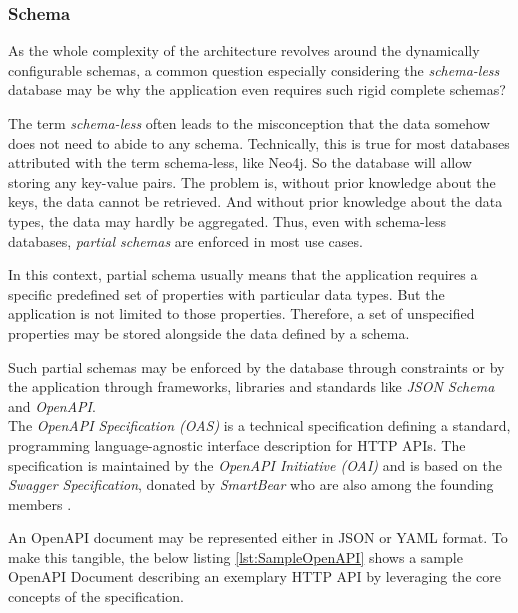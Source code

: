 \subsubsection{Schema}
As the whole complexity of the architecture revolves around the dynamically configurable schemas, a common question especially considering the \emph{schema-less} database may be why the application even requires such rigid complete schemas?\par
The term \emph{schema-less} often leads to the misconception that the data somehow does not need to abide to any schema. Technically, this is true for most databases attributed with the term schema-less, like Neo4j. So the database will allow storing any key-value pairs. The problem is, without prior knowledge about the keys, the data cannot be retrieved. And without prior knowledge about the data types, the data may hardly be aggregated. Thus, even with schema-less databases, \emph{partial schemas} are enforced in most use cases.\par
In this context, partial schema usually means that the application requires a specific predefined set of properties with particular data types. But the application is not limited to those properties. Therefore, a set of unspecified properties may be stored alongside the data defined by a schema.\par 
Such partial schemas may be enforced by the database through constraints or by the application through frameworks, libraries and standards like \emph{JSON Schema} \cite{JsonSchema} and \emph{OpenAPI}.\\

The \emph{OpenAPI Specification (OAS)} is a technical specification defining a standard, programming language-agnostic interface description for HTTP APIs. The specification is maintained by the \emph{OpenAPI Initiative (OAI)} and is based on the \emph{Swagger Specification}, donated by \emph{SmartBear} who are also among the founding members \cite{OpenAPISpec}.\par
An OpenAPI document may be represented either in JSON or YAML format. To make this tangible, the below listing \ref{lst:SampleOpenAPI} shows a sample OpenAPI Document describing an exemplary HTTP API by leveraging the core concepts of the specification.


